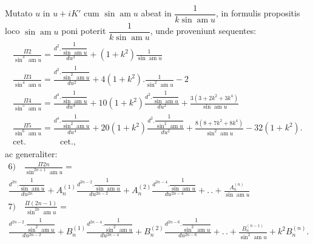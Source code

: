 \documentclass{article}
\begin{document}
Mutato $u$ in $u+iK'$ cum $\sin\operatorname{am}u$ abeat in $\dfrac{1}{k\sin\operatorname{am}u}$, in formulis propositis loco $\sin\operatorname{am}u$ poni poterit $\dfrac{1}{k\sin\operatorname{am}u}$, unde proveniunt sequentes:
\[
\begin{gathered}
\frac{\Pi 2}{\sin^{3}\operatorname{am}u}=\frac{d^{2}.\dfrac{1}{\sin\operatorname{am}u}}{du^{2}}+(1+k^{2})\frac{1}{\sin\operatorname{am}u}\\[1.5ex]
\frac{\Pi 3}{\sin^{4}\operatorname{am}u}=\frac{d^{2}.\dfrac{1}{\sin^{2}\operatorname{am}u}}{du^{2}}+4(1+k^{2}).\frac{1}{\sin^{2}\operatorname{am}u}-2\\[1.5ex]
\frac{\Pi 4}{\sin^{5}\operatorname{am}u}=\frac{d^{4}.\dfrac{1}{\sin\operatorname{am}u}}{du^{4}}+10(1+k^{2})\frac{d^{2}.\dfrac{1}{\sin\operatorname{am}u}}{du^{2}}+\frac{3(3+2k^{2}+3k^{4})}{\sin\operatorname{am}u}\\[1.5ex]
\frac{\Pi 5}{\sin^{6}\operatorname{am}u}=\frac{d^{4}.\dfrac{1}{\sin^{2}\operatorname{am}u}}{du^{4}}+20(1+k^{2})\frac{d^{2}.\dfrac{1}{\sin^{2}\operatorname{am}u}}{du^{2}}+\frac{8(8+7k^{2}+8k^{4})}{\sin^{2}\operatorname{am}u}-32(1+k^{2}).\\[1.5ex]
\text{cet.}\qquad\qquad\text{cet.},
\end{gathered}
\]
ac generaliter:
\[
\begin{gathered}
\text{6)}\quad\frac{\Pi 2n}{\sin^{2n+1}\operatorname{am}u}=\\[1.5ex]
\frac{d^{2n}.\dfrac{1}{\sin\operatorname{am}u}}{du^{2n}}+A_{n}^{(1)}\frac{d^{2n-2}.\dfrac{1}{\sin\operatorname{am}u}}{du^{2n-2}}+A_{n}^{(2)}\frac{d^{2n-4}.\dfrac{1}{\sin\operatorname{am}u}}{du^{2n-4}}+.\,.+\frac{A_{n}^{(n)}}{\sin\operatorname{am}u}\\[1.5ex]
\text{7)}\quad\frac{\Pi(2n-1)}{\sin^{2n}\operatorname{am}u}=\\[1.5ex]
\frac{d^{2n-2}.\dfrac{1}{\sin^{2}\operatorname{am}u}}{du^{2n-2}}+B_{n}^{(1)}\frac{d^{2n-4}.\dfrac{1}{\sin^{2}\operatorname{am}u}}{du^{2n-4}}+B_{n}^{(2)}\frac{d^{2n-6}.\dfrac{1}{\sin^{2}\operatorname{am}u}}{du^{2n-6}}+.\,.+\frac{B_{n}^{(n-1)}}{\sin^{2}\operatorname{am}u}+k^{2}B_{n}^{(n)}.
\end{gathered}
\]
\end{document}
